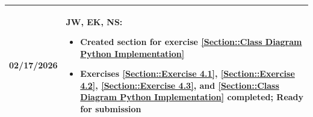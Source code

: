 \begin{longtable}{|l||p{13.5cm}|}
02/17/2026 & 
JW, EK, NS:
\begin{itemize}[topsep=0pt,itemsep=0pt,parsep=0pt,partopsep=0pt,leftmargin=12pt]
\item Created section for exercise \ref{Section::Class Diagram Python Implementation}
\item Exercises \ref{Section::Exercise 4.1}, \ref{Section::Exercise 4.2},  \ref{Section::Exercise 4.3}, and \ref{Section::Class Diagram Python Implementation} completed; Ready for submission
\end{itemize}
\\ \hline

\end{longtable}



